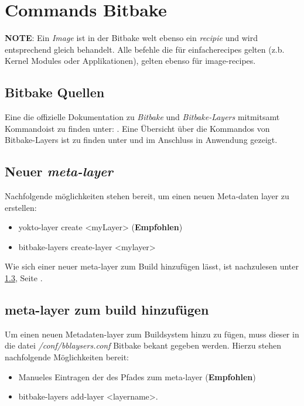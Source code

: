 
\chapter{Commands Bitbake}%
\label{cha:commands_bitbake}

\textbf{NOTE}: Ein \textit{Image} ist in der Bitbake welt ebenso
ein \textit{recipie} und wird entsprechend gleich behandelt. Alle befehle die
für \glq einfache\grq recipes gelten (z.b. Kernel Modules oder Applikationen),
gelten ebenso für image-recipes.


\section{Bitbake Quellen}%
\label{sec:bitbake_quellen}
Eine die offizielle Dokumentation zu \textit{Bitbake} und
\textit{Bitbake-Layers} mitmitsamt Kommandoist zu finden unter:
.  Eine Übersicht über die Kommandos von Bitbake-Layers  ist zu finden unter
\cite[156]{Gonzalez2018:Embedded_Linux_Development_Using_Yocto_Project_Cookbook_2nd}
und im Anschluss in Anwendung gezeigt.


\section{Neuer \textit{meta-layer}}%
\label{sec:_a_new_recipes}
Nachfolgende möglichkeiten stehen bereit, um einen neuen Meta-daten layer zu
erstellen:
\begin{itemize}
    \item yokto-layer create <myLayer> (\textbf{Empfohlen})
    \item bitbake-layers create-layer <mylayer>
\end{itemize}

Wie sich einer neuer meta-layer zum Build hinzufügen lässt, ist nachzulesen
unter \ref{sec:meta_layer_zum_build_hinzufugen}, Seite
\pageref{sec:meta_layer_zum_build_hinzufugen}.

\section{meta-layer zum build hinzufügen}%
\label{sec:meta_layer_zum_build_hinzufugen}
Um einen neuen Metadaten-layer zum Buildsystem hinzu zu fügen, muss dieser in
die datei \textit{/conf/bblaysers.conf} Bitbake bekant gegeben werden. Hierzu
stehen nachfolgende Möglichkeiten bereit:
\begin{itemize}
    \item Manueles Eintragen der des Pfades zum meta-layer (\textbf{Empfohlen})
    \item bitbake-layers add-layer <layername>.
\end{itemize}



